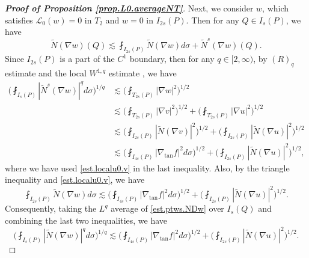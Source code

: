 \documentclass[reqno,12pt]{amsart} %
\theoremstyle{definition}
\theoremstyle{remark}
\numberwithin{equation}{section}
\newcommand{\cL}{\mathcal{L}}
\begin{document}
\begin{proof}[\textbf{Proof of Proposition \ref{prop.L0.averageNT}}]
    Next, we consider $w$, which satisfies $\cL_0(w) = 0$ in $T_2$ and $w = 0$ in $I_{2s}(P)$. Then for any $Q \in I_s(P)$, we have
    \begin{equation}\label{est.ptws.NDw}
        \widetilde{N}(\nabla w)(Q) \lesssim \fint_{I_{2s}(P)} \widetilde{N}(\nabla w) d\sigma + \widetilde{N}^s(\nabla w)(Q).
    \end{equation}
    Since $I_{2s}(P)$ is a part of the $C^1$ boundary, then for any $q\in [2,\infty)$, by $(R)_q$ estimate and the local $W^{1,q}$ estimate \cite{Fabes1978, DPP07}, we have
    \begin{equation}
    \begin{aligned}
        \bigg( \fint_{I_s(P)} |\widetilde{N}^s(\nabla w)|^q d\sigma \bigg)^{1/q} & \lesssim \bigg( \fint_{T_{2s}(P)} |\nabla w|^2 \bigg)^{1/2} \\
        & \lesssim \bigg( \fint_{T_{2s}(P)} |\nabla v|^2 \bigg)^{1/2} + \bigg( \fint_{T_{2s}(P)} |\nabla u|^2 \bigg)^{1/2} \\
        & \lesssim \bigg( \fint_{I_{2s}(P)} |\widetilde{N} (\nabla v)|^2 \bigg)^{1/2} + \bigg( \fint_{I_{2s}(P)} |\widetilde{N}(\nabla u)|^2 \bigg)^{1/2} \\
        & \lesssim \bigg( \fint_{I_{4s}(P)} |\nabla_{\tan} f|^2 d\sigma \bigg)^{1/2} + \bigg( \fint_{I_{2s}(P)} |\widetilde{N}(\nabla u)|^2 \bigg)^{1/2},
    \end{aligned}
    \end{equation}
    where we have used \eqref{est.localu0.v} in the last inequality.
    Also, by the triangle inequality and \eqref{est.localu0.v}, we have
    \begin{equation}
        \fint_{I_{2s}(P)} \widetilde{N}(\nabla w) d\sigma \lesssim \bigg( \fint_{I_{4s}(P)} |\nabla_{\tan} f|^2 d\sigma \bigg)^{1/2} + \bigg( \fint_{I_{2s}(P)} |\widetilde{N}(\nabla u)|^2 \bigg)^{1/2}.
    \end{equation}
    Consequently, taking the $L^q$ average of \eqref{est.ptws.NDw} over $I_s(Q)$ and combining the last two inequalities, we have
    \begin{equation}
        \bigg( \fint_{I_{s}(P)} |\widetilde{N}(\nabla w)|^q d\sigma \bigg)^{1/q} \lesssim \bigg( \fint_{I_{4s}(P)} |\nabla_{\tan} f|^2 d\sigma \bigg)^{1/2} + \bigg( \fint_{I_{2s}(P)} |\widetilde{N}(\nabla u)|^2 \bigg)^{1/2}.
    \end{equation}


\end{proof}
\end{document}

